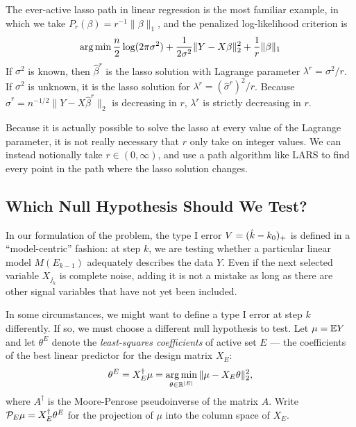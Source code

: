 \documentclass{article}
\begin{document}
The ever-active lasso path in linear regression is the most familiar example, in which we take $P_r(\beta) = r^{-1}\|\beta\|_1$, and the penalized log-likelihood criterion is
\begin{equation}
  \operatorname*{arg\,min} \frac{n}{2}\log(2\pi\sigma^2) 
  + \frac{1}{2\sigma^2}\|Y - X\beta\|_2^2 + \frac{1}{r}\|\beta\|_1
\end{equation}
If $\sigma^2$ is known, then $\hat\beta^{r}$ is the lasso solution with Lagrange parameter $\lambda^r = \sigma^{2}/r$. If $\sigma^2$ is unknown, it is the lasso solution for $\lambda^r = (\hat\sigma^r)^2/r$. Because $\hat\sigma^r = n^{-1/2}\|Y-X\hat\beta^r\|_2$ is decreasing in $r$, $\lambda^r$ is strictly decreasing in $r$.

Because it is actually possible to solve the lasso at every value of the Lagrange parameter, it is not really necessary that $r$ only take on integer values. We can instead notionally take $r\in (0,\infty)$, and use a path algorithm like LARS \citep{taylor2014exact} to find every point in the path where the lasso solution changes.

\subsection{Which Null Hypothesis Should We Test?}
\label{sec:whichnull}


In our formulation of the problem, the type I error $V=(\hat{k}-k_0)_+$ is defined in a ``model-centric'' fashion: at step $k$, we are testing  whether a particular linear model $M(E_{k-1})$ adequately describes the data $Y$. Even if the next selected variable $X_{j_k}$ is complete noise, adding it is not a mistake as long as there are other signal variables that have not yet been included. 

In some circumstances, we might want to define a type I error at step $k$ differently. If so, we must choose a different null hypothesis to test. Let $\mu = \mathbb{E} Y$ and let $\theta^E$ denote the {\em least-squares coefficients} of active set $E$ --- the coefficients of the best linear predictor for the design matrix $X_E$:
\[
\theta^E = X_E^\dagger \mu = \operatorname*{arg\,min}_{\theta\in \mathbb{R}^{|E|}} \|\mu - X_E\theta\|_2^2,
\]
where $A^\dagger$ is the Moore-Penrose pseudoinverse of the matrix $A$. Write $\mathcal{P}_E\mu = X_E^\dagger \theta^E$ for the projection of $\mu$ into the column space of $X_E$.
\end{document}
